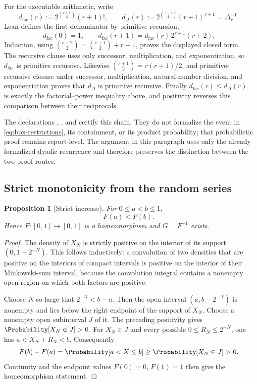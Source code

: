\documentclass[11pt,oneside]{article}
\newtheorem{proposition}[theorem]{Proposition}
\theoremstyle{definition}
\theoremstyle{remark}
\numberwithin{equation}{section}
\begin{document}
For the executable arithmetic, write
\[
 d_{\mathrm{fac}}(r):=2^{\binom{r+1}{2}}(r+1)!,
 \qquad
 d_{\Delta}(r):=2^{\binom{r+1}{2}}(r+1)^{r+1}=\Delta_r^{-1}.
\]
Lean defines the first denominator by primitive recursion,
\[
 d_{\mathrm{fac}}(0)=1,
 \qquad
 d_{\mathrm{fac}}(r+1)
 =d_{\mathrm{fac}}(r)\,2^{r+1}(r+2).
\]
Induction, using
$\binom{r+2}{2}=\binom{r+1}{2}+r+1$, proves the displayed closed form.
The recursive clause uses only successor, multiplication, and exponentiation,
so $d_{\mathrm{fac}}$ is primitive recursive.  Likewise
$\binom{r+1}{2}=r(r+1)/2$, and primitive-recursive closure under successor,
multiplication, natural-number division, and exponentiation proves that
$d_{\Delta}$ is primitive recursive.  Finally
$d_{\mathrm{fac}}(r)\le d_{\Delta}(r)$ is exactly the factorial--power
inequality above, and positivity reverses this comparison between their
reciprocals.

The declarations
,
, and
 certify this
chain.  They do not formalize the event in
\eqref{eq:box-restrictions}, its containment, or its product probability;
that probabilistic proof remains report-level.  The argument in this paragraph
uses only the already formalized dyadic recurrence and therefore preserves the
distinction between the two proof routes.

\subsection{Strict monotonicity from the random series}

\begin{proposition}[Strict increase]\label{prop:strict-increase}
For $0\le a<b\le1$,
\begin{equation}\label{eq:strict-increase}
 F(a)<F(b).
\end{equation}
Hence $F:[0,1]\to[0,1]$ is a homeomorphism and $G=F^{-1}$ exists.
\end{proposition}

\begin{proof}
The density of $X_N$ is strictly positive on the interior of its support
$(0,1-2^{-N})$.  This follows inductively: a convolution of two densities
that are positive on the interiors of compact intervals is positive on the
interior of their Minkowski-sum interval, because the convolution integral
contains a nonempty open region on which both factors are positive.

Choose $N$ so large that $2^{-N}<b-a$.  Then the open interval
$(a,b-2^{-N})$ is nonempty and lies below the right endpoint of the support of
$X_N$.  Choose a nonempty open subinterval $J$ of it.  The preceding positivity
gives $\Probability[X_N\in J]>0$.  For $X_N\in J$ and every possible
$0\le R_N\le2^{-N}$, one has $a<X_N+R_N<b$.  Consequently
\[
 F(b)-F(a)=\Probability[a<X\le b]\ge\Probability[X_N\in J]>0.
\]
Continuity and the endpoint values $F(0)=0$, $F(1)=1$ then give the
homeomorphism statement.
\end{proof}
\end{document}
